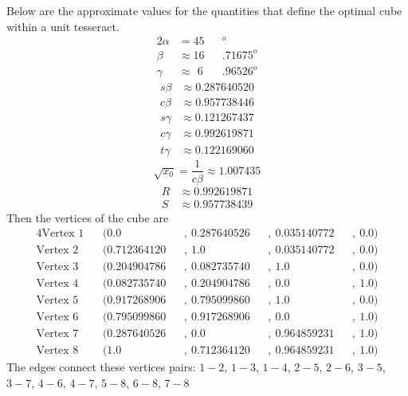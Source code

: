 Below are the approximate values for the quantities that define the optimal
cube within a unit tesseract.
\begin{alignat*}{2}
\alpha &=       45&&      ^o \\
\beta  &\approx 16&&.71675^o \\
\gamma &\approx ~\,6&&.96526^o
\end{alignat*}
\begin{align*}
s\beta &\approx 0.287640520 \\
c\beta &\approx 0.957738446
\end{align*}
\begin{align*}
s\gamma &\approx 0.121267437 \\
c\gamma &\approx 0.992619871 \\
t\gamma &\approx 0.122169060
\end{align*}
\begin{equation*}
\sqrt{x_0} = \frac{1}{c\beta} \approx 1.007435
\end{equation*}
\begin{align*}
R &\approx 0.992619871 \\
S &\approx 0.957738439
\end{align*}
Then the vertices of the cube are
\begin{alignat*}{4}
\text{Vertex 1} ~~~~& (0.0         &&,~0.287640526 &&,~0.035140772 &&,~0.0) \\
\text{Vertex 2} ~~~~& (0.712364120 &&,~1.0         &&,~0.035140772 &&,~0.0) \\
\text{Vertex 3} ~~~~& (0.204904786 &&,~0.082735740 &&,~1.0         &&,~0.0) \\
\text{Vertex 4} ~~~~& (0.082735740 &&,~0.204904786 &&,~0.0         &&,~1.0) \\
\text{Vertex 5} ~~~~& (0.917268906 &&,~0.795099860 &&,~1.0         &&,~0.0) \\
\text{Vertex 6} ~~~~& (0.795099860 &&,~0.917268906 &&,~0.0         &&,~1.0) \\
\text{Vertex 7} ~~~~& (0.287640526 &&,~0.0         &&,~0.964859231 &&,~1.0) \\
\text{Vertex 8} ~~~~& (1.0         &&,~0.712364120 &&,~0.964859231 &&,~1.0)
\end{alignat*}
The edges connect these vertices pairs:
$1\!-\!2$, $1\!-\!3$, $1\!-\!4$, $2\!-\!5$, $2\!-\!6$, $3\!-\!5$,
$3\!-\!7$, $4\!-\!6$, $4\!-\!7$, $5\!-\!8$, $6\!-\!8$, $7\!-\!8$


